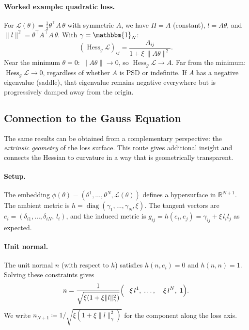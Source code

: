 \documentclass{article}
\newcommand{\loss}{\mathcal{L}}
\newcommand{\Id}{\mathbbm{1}}
\begin{document}
\paragraph{Worked example: quadratic loss.}
For $\loss(\theta) = \tfrac{1}{2}\theta^\top A\,\theta$ with
symmetric $A$, we have $H = A$ (constant),
$l = A\theta$, and $\|l\|^2 = \theta^\top A^\top A\,\theta$.
With $\gamma = \Id_N$:
\begin{equation}
    (\operatorname{Hess}_g\loss)_{ij}
    = \frac{A_{ij}}{1 + \xi\,\|A\theta\|^2}.
\end{equation}
Near the minimum $\theta=0$: $\|A\theta\|\to 0$, so
$\operatorname{Hess}_g\loss \to A$.
Far from the minimum: $\operatorname{Hess}_g\loss \to 0$,
regardless of whether $A$ is PSD or indefinite.
If $A$ has a negative eigenvalue (saddle), that eigenvalue remains
negative everywhere but is progressively damped away from the origin.

\subsection{Connection to the Gauss Equation}\label{sec:gauss}

The same results can be obtained from a complementary perspective:
the \emph{extrinsic geometry} of the loss surface.
This route gives additional insight and connects the Hessian
to curvature in a way that is geometrically transparent.

\paragraph{Setup.}
The embedding $\phi(\theta) = (\theta^1,\ldots,\theta^N,\loss(\theta))$
defines a hypersurface in $\mathbb{R}^{N+1}$.
The ambient metric is
$h=\operatorname{diag}(\gamma_1,\ldots,\gamma_N,\xi)$.
The tangent vectors are $e_i = (\delta_{i1},\ldots,\delta_{iN},\,l_i)$,
and the induced metric is $g_{ij} = h(e_i, e_j) = \gamma_{ij} + \xi\,l_i l_j$
as expected.

\paragraph{Unit normal.}
The unit normal $n$ (with respect to $h$) satisfies
$h(n,e_i)=0$ and $h(n,n)=1$.
Solving these constraints gives
\begin{equation}
    n = \frac{1}{\sqrt{\xi(1+\xi\|l\|_\gamma^2)}}
    \Bigl(-\xi\,l^1,\;\ldots,\;-\xi\,l^N,\;1\Bigr).
\end{equation}
We write $n_{N+1} \coloneqq 1/\sqrt{\xi(1+\xi\|l\|_\gamma^2)}$
for the component along the loss axis.
\end{document}
